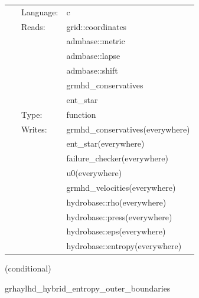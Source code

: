  \begin{tabular*}{160mm}{cll} 
~ & Language:  & c \\ 
~ & Reads:  & grid::coordinates \\ 
~& ~ &admbase::metric\\ 
~& ~ &admbase::lapse\\ 
~& ~ &admbase::shift\\ 
~& ~ &grmhd\_conservatives\\ 
~& ~ &ent\_star\\ 
~ & Type:  & function \\ 
~ & Writes:  & grmhd\_conservatives(everywhere) \\ 
~& ~ &ent\_star(everywhere)\\ 
~& ~ &failure\_checker(everywhere)\\ 
~& ~ &u0(everywhere)\\ 
~& ~ &grmhd\_velocities(everywhere)\\ 
~& ~ &hydrobase::rho(everywhere)\\ 
~& ~ &hydrobase::press(everywhere)\\ 
~& ~ &hydrobase::eps(everywhere)\\ 
~& ~ &hydrobase::entropy(everywhere)\\ 
\end{tabular*} 


\vspace{5mm}

   (conditional) 

\hspace{5mm} grhaylhd\_hybrid\_entropy\_outer\_boundaries 

\hspace{5mm}{\it entropy+hybrid version of grhaylhd\_outer\_boundaries } 


\hspace{5mm}

